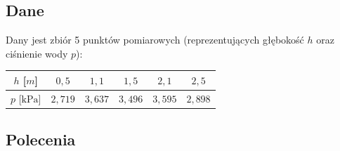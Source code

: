 \documentclass[a4paper,11pt]{article}
\begin{document}
\subsection*{Dane}

Dany jest zbiór 5 punktów pomiarowych (reprezentujących głębokość $h$ oraz ciśnienie wody $p$):

\begin{center}
\begin{tabular}{c|ccccc}
  \toprule
  $h$ [$m$] & $0{,}5$ & $1{,}1$ & $1{,}5$ & $2{,}1$ & $2{,}5$ \\
  \midrule
  $p$ [$\text{kPa}$] & $2{,}719$ & $3{,}637$ & $3{,}496$ & $3{,}595$ & $2{,}898$ \\
  \bottomrule
\end{tabular}
\end{center}

\subsection*{Polecenia}
\end{document}
